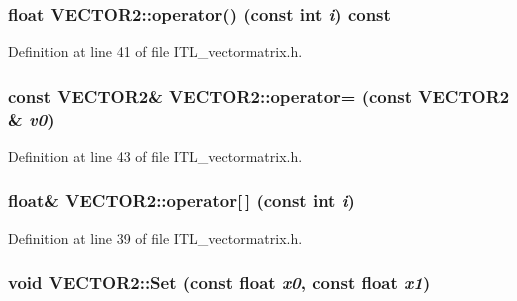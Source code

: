 \hypertarget{classVECTOR2_ab99d8f6de7559cc0ce413820449dff33}{
\subsubsection[{operator()}]{\setlength{\rightskip}{0pt plus 5cm}float VECTOR2::operator() (const int {\em i}) const}}
\label{classVECTOR2_ab99d8f6de7559cc0ce413820449dff33}


Definition at line 41 of file ITL\_\-vectormatrix.h.

\hypertarget{classVECTOR2_a89f1c28aa5e14ab1f32d12d9d68b4648}{
\subsubsection[{operator=}]{\setlength{\rightskip}{0pt plus 5cm}const {\bf VECTOR2}\& VECTOR2::operator= (const {\bf VECTOR2} \& {\em v0})}}
\label{classVECTOR2_a89f1c28aa5e14ab1f32d12d9d68b4648}


Definition at line 43 of file ITL\_\-vectormatrix.h.

\hypertarget{classVECTOR2_af6d23b6a2fd595314c7b0fbf83ad723a}{
\subsubsection[{operator[]}]{\setlength{\rightskip}{0pt plus 5cm}float\& VECTOR2::operator\mbox{[}$\,$\mbox{]} (const int {\em i})}}
\label{classVECTOR2_af6d23b6a2fd595314c7b0fbf83ad723a}


Definition at line 39 of file ITL\_\-vectormatrix.h.

\hypertarget{classVECTOR2_acb0b60a765f7c11fbc43d6559f8eae19}{
\subsubsection[{Set}]{\setlength{\rightskip}{0pt plus 5cm}void VECTOR2::Set (const float {\em x0}, \/  const float {\em x1})}}
\label{classVECTOR2_acb0b60a765f7c11fbc43d6559f8eae19}


